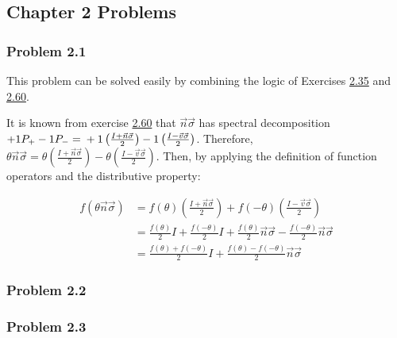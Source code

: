 \subsection{Chapter 2 Problems}
\subsubsection{Problem 2.1}
This problem can be solved easily by combining the
logic of Exercises
\hyperref[sec:nielsen-and-chuang-exercise-2-35]{2.35} and
\hyperref[sec:nielsen-and-chuang-exercise-2-60]{2.60}.

It is known from exercise \hyperref[sec:nielsen-and-chuang-exercise-2-60]{2.60}
that $\vec{n} \vec{\sigma}$ has spectral decomposition
$+1P_+ - 1P_- = \\ +1 \left( \frac{I + \vec{n}\vec{\sigma}}{2} \right)
-1 \left( \frac{I - \vec{v}\vec{\sigma}}{2} \right)$.
Therefore, $\theta \vec{n} \vec{\sigma} =
\theta \left( \frac{I + \vec{n}\vec{\sigma}}{2} \right)
- \theta \left( \frac{I - \vec{v}\vec{\sigma}}{2} \right)$.
Then, by applying the definition of function operators and
the distributive property:

\begin{align}
    f(\theta \vec{n} \vec{\sigma}) &= f(\theta) \left(
        \frac{I + \vec{n}\vec{\sigma}}{2} \right) +
        f(-\theta) \left( \frac{I - \vec{v}\vec{\sigma}}{2} \right) \\
    &= \frac{f(\theta)}{2}I + \frac{f(-\theta)}{2}I +
        \frac{f(\theta)}{2}\vec{n}\vec{\sigma} -
        \frac{f(-\theta)}{2}\vec{n}\vec{\sigma} \\
    &= \frac{f(\theta) + f(-\theta)}{2}I +
        \frac{f(\theta) - f(-\theta)}{2}\vec{n}\vec{\sigma}
\end{align}

\subsubsection{Problem 2.2}

\subsubsection{Problem 2.3}
